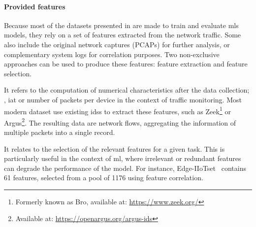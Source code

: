 
\begin{table}
  \centering
  \caption{
    Most common feature-based datasets for \glspl{nids}.
    \label{tbl:datasets}  
  }
  
  \end{table}

\paragraph{Provided features}

Because most of the datasets presented in  are made to train and evaluate \glspl{ml} models, they rely on a set of features extracted from the network traffic.
Some also include the original network captures (PCAPs) for further analysis, or complementary system logs for correlation purposes.
Two non-exclusive approaches can be used to produce these features: feature extraction and feature selection.

\begin{description}[labelindent=1em]
  \item[Feature extraction:] It refers to the computation of numerical characteristics after the data collection; \eg, \gls{iat} or number of packets per device in the context of traffic monitoring.
  Most modern dataset use existing \glspl{ids} to extract these features, such as Zeek\footnote{Formerly known as Bro, available at: \url{https://www.zeek.org/}} or Argus\footnote{Available at: \url{https://openargus.org/argus-ids}}.
  The resulting data are network flows, aggregating the information of multiple packets into a single record.

  \item[Feature selection:] It relates to the selection of the relevant features for a given task.
  This is particularly useful in the context of \gls{ml}, where irrelevant or redundant features can degrade the performance of the model.
  For instance, Edge-IIoTset~\cite{ferrag_EdgeIIoTsetNewComprehensive_2022} contains 61 features, selected from a pool of 1176 using feature correlation.
\end{description}

